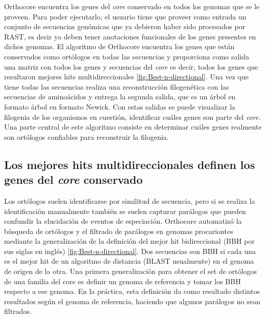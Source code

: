 \documentclass[12pt,twoside]{reedthesis}
\begin{document}
  Orthocore encuentra los genes del \emph{core} conservado en todos los
  genomas que se le proveen. Para poder ejecutarlo, el usuario tiene que
  proveer como entrada un conjunto de secuencias genómicas que ya debieron
  haber sido procesados por RAST, es decir ya deben tener anotaciones
  funcionales de los genes presentes en dichos genomas. El algoritmo de
  Orthocore encuentra los genes que están conservados como ortólogos en
  todas las secuencias y proporciona como salida una matriz con todos los
  genes y secuencias del \emph{core} es decir, todos los genes que
  resultaron mejores hits multidireccionales
  \autoref{fig:Best-n-directional}. Una vez que tiene todas las secuencias
  realiza una reconstrucción filogenética con las secuencias de
  aminoácidos y entrega la segunda salida, que es un árbol en formato
  árbol en formato Newick. Con estas salidas se puede visualizar la
  filogenia de los organismos en cuestión, identificar cuáles genes son
  parte del \emph{core}. Una parte central de este algoritmo consiste en
  determinar cuáles genes realmente son ortólogos confiables para
  reconstruir la filogenia.
  
  \subsection{\texorpdfstring{Los mejores hits multidireccionales definen
  los genes del \emph{core}
  conservado}{Los mejores hits multidireccionales definen los genes del core conservado}}\label{los-mejores-hits-multidireccionales-definen-los-genes-del-core-conservado}
  
  Los ortólogos suelen identificarse por similitud de secuencia, pero si
  se realiza la identificación manualmente también se suelen capturar
  parálogos que pueden confundir la elucidación de eventos de especiación.
  Orthocore automatizó la búsqueda de ortólogos y el filtrado de parálogos
  en genomas procariontes mediante la generalización de la definición del
  mejor hit bidireccional (BBH por sus siglas en inglés)
  \autoref{fig:Best-n-directional}. Dos secuencias son BBH si cada una es
  el mejor hit de un algoritmo de distancia (BLAST usualmente) en el
  genoma de origen de la otra. Una primera generalización para obtener el
  set de ortólogos de una familia del core es definir un genoma de
  referencia y tomar los BBH respecto a ese genoma. En la práctica, esta
  definición da como resultado distintos resultados según el genoma de
  referencia, haciendo que algunos parálogos no sean filtrados.
  
\end{document}
